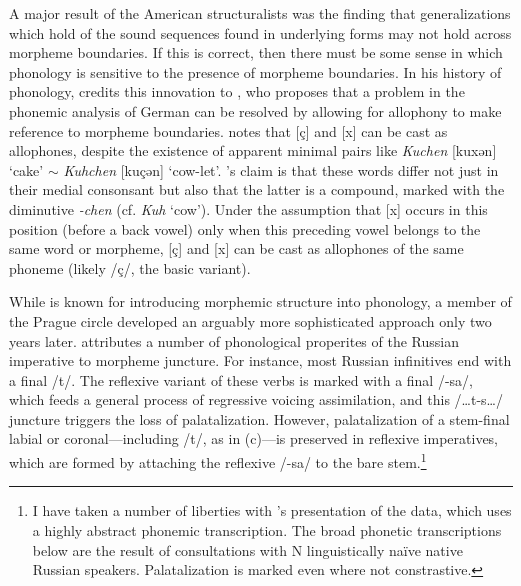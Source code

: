 A major result of the American structuralists was the finding that generalizations which hold of the sound sequences found in underlying forms may not hold across morpheme boundaries. If this is correct, then there must be some sense in which phonology is sensitive to the presence of morpheme boundaries. In his history of phonology, \citet[][267]{Anderson1985} credits this innovation to \citet{Bloomfield1930}, who proposes that a problem in the phonemic analysis of German can be resolved by allowing for allophony to make reference to morpheme boundaries. \citeauthor{Bloomfield1930} notes that [ç] and [x] can be cast as allophones, despite the existence of apparent minimal pairs like \emph{Kuchen} [ku\lm xən] `cake' $\sim$ \emph{Kuhchen} [ku\lm çən] `cow-let'. \citeauthor{Bloomfield1930}'s claim is that these words differ not just in their medial consonsant but also that the latter is a compound, marked with the diminutive \emph{-chen} (cf. \emph{Kuh} `cow'). Under the assumption that [x] occurs in this position (before a back vowel) only when this preceding vowel belongs to the same word or morpheme, [ç] and [x] can be cast as allophones of the same phoneme (likely /ç/, the basic variant).

While \citeauthor{Bloomfield1930} is known for introducing morphemic structure into phonology, a member of the Prague circle developed an arguably more sophisticated approach only two years later. \citet{Jakobson1932} attributes a number of phonological properites of the Russian imperative to morpheme juncture. For instance, most Russian infinitives end with a final /t\pal/. The reflexive variant of these verbs is marked with a final /-sa/, which feeds a general process of regressive voicing assimilation, and this /\ldots t\pal-s\ldots/ juncture triggers the loss of palatalization. However, palatalization of a stem-final labial or coronal---including /t\pal/, as in (\nextx c)---is preserved in reflexive imperatives, which are formed by attaching the reflexive /-sa/ to the bare stem.\footnote{I have taken a number of liberties with \citeauthor{Jakobson1932}'s presentation of the data, which uses a highly abstract phonemic transcription. The broad phonetic transcriptions below are the result of consultations with N linguistically na\"ive native Russian speakers. Palatalization is marked even where not constrastive.}

